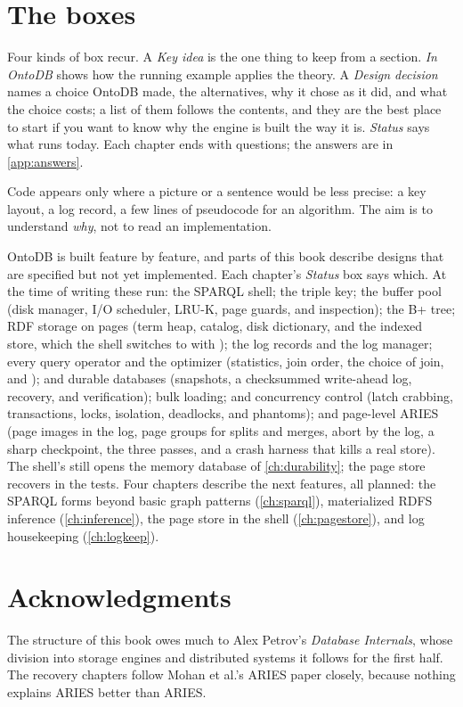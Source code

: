\section*{The boxes}

Four kinds of box recur. A \emph{Key idea} is the one thing to keep from a
section. \emph{In OntoDB} shows how the running example applies the theory. A
\emph{Design decision} names a choice OntoDB made, the alternatives, why it chose
as it did, and what the choice costs; a list of them follows the contents, and
they are the best place to start if you want to know why the engine is built the
way it is. \emph{Status} says what runs today. Each chapter ends with questions;
the answers are in \cref{app:answers}.

Code appears only where a picture or a sentence would be less precise: a key
layout, a log record, a few lines of pseudocode for an algorithm. The aim is to
understand \emph{why}, not to read an implementation.

\begin{status}
OntoDB is built feature by feature, and parts of this book describe designs
that are specified but not yet implemented. Each chapter's \emph{Status} box
says which. At the time of writing these run: the SPARQL shell; the triple key;
the buffer pool (disk manager, I/O scheduler, LRU-K, page guards, and
inspection); the B+ tree; RDF storage on pages (term heap, catalog, disk
dictionary, and the indexed store, which the shell switches to with
); the log records and the log
manager; every query operator and the optimizer (statistics, join order, the
choice of join, and ); and durable
databases (snapshots, a checksummed write-ahead log, recovery, and
verification); bulk loading; and concurrency control (latch crabbing,
transactions, locks, isolation, deadlocks, and phantoms); and page-level
ARIES (page images in the log, page groups for splits and merges, abort by the
log, a sharp checkpoint, the three passes, and a crash harness that kills a
real store). The shell's  still opens the memory database
of \cref{ch:durability}; the page store recovers in the tests.
Four chapters describe the next features, all planned: the SPARQL forms beyond
basic graph patterns (\cref{ch:sparql}), materialized RDFS inference
(\cref{ch:inference}), the page store in the shell (\cref{ch:pagestore}), and
log housekeeping (\cref{ch:logkeep}).
\end{status}

\section*{Acknowledgments}

The structure of this book owes much to Alex Petrov's \emph{Database Internals},
whose division into storage engines and distributed systems it follows for the
first half. The recovery chapters follow Mohan et al.'s ARIES paper closely,
because nothing explains ARIES better than ARIES.

